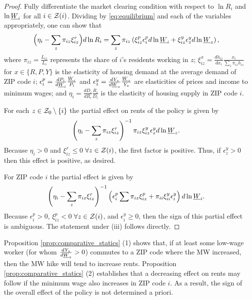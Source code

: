 \begin{proof}
    Fully differentiate the market clearing condition with respect to $\ln R_i$ 
    and $\ln \underline{W}_i$ for all $i\in\mathcal{Z}(i)$.
    Dividing by \ref{eq:equilibrium} and each of the variables appropriately, 
    one can show that
    \begin{equation}\label{eq:diff_equilibrium}
        \Big(\eta_i - \sum_z \pi_{iz} \xi^r_{iz} \Big) d \ln R_i
        = 
        \sum_z \pi_{iz} \left(\xi^p_{iz} \epsilon_{i}^p d \ln \underline{W}_i 
                            + \xi^y_{iz} \epsilon_{z}^y d \ln \underline{W}_z \right) ,
    \end{equation}
    where
    $\pi_{iz} = \frac{L_{iz}}{L_i}$ represents the share of $i$'s residents 
    working in $z$;
    $\xi_{iz}^x = \frac{d h_{iz}}{d x_i} \frac{x_i}{\sum_z \pi_{iz} h_{iz}}$ for
    $x\in\{R,P,Y\}$ is the elasticity of housing demand at the average demand of
    ZIP code $i$;
    $\epsilon_{i}^p = \frac{d P_i}{d \underline{W}_i} \frac{\underline{W}_i}{P_i}$ and 
    $\epsilon_{z}^y = \frac{d Y_z}{d \underline{W}_z} \frac{\underline{W}_z}{Y_z}$ are
    elasticities of prices and income to minimum wages; and
    $\eta_i = \frac{d D_i}{d R_i} \frac{R_i}{D_i}$ is the elasticity 
    of housing supply in ZIP code $i$.

    For each $z\in\mathcal{Z}_0\setminus\{i\}$ the partial effect on rents of the policy
    is given by 
    $$\left(\eta_i - \sum_z \pi_{iz} \xi^r_{iz}\right)^{-1} 
      \pi_{iz}\xi^y_{iz}\epsilon_{z}^y d\ln\underline{W}_z.$$
    Because $\eta_i>0$ and $\xi^r_{iz}\leq 0$  $\forall z\in\mathcal{Z}(i)$, the first 
    factor is positive.
    Thus, if $\epsilon_{z}^y>0$ then this effect is positive, as desired.

    For ZIP code $i$ the partial effect is given by
    $$\left(\eta_i - \sum_z \pi_{iz} \xi^r_{iz}\right)^{-1} 
      \left(\epsilon_{i}^p \sum \pi_{iz}\xi^p_{iz} 
            + \pi_{ii}\xi^y_{ii}\epsilon_i^y \right)d\ln\underline{W}_i.$$
    Because $\epsilon_{i}^p>0$, $\xi^p_{iz}<0$ $\forall z\in\mathcal{Z}(i)$,
    and $\epsilon_{i}^y\geq0$, 
    then the sign of this partial effect is ambiguous.
    The statement under (iii) follows directly.
\end{proof}

Proposition \ref{prop:comparative_statics} (1) shows that, 
if at least some low-wage worker (for whom $\frac{d Y_z}{d \underline{W}_z}>0$) 
commutes to a ZIP code where the MW increased, 
then the MW hike will tend to increase rents.
Proposition \ref{prop:comparative_statics} (2) establishes that a decreasing
effect on rents may follow if the minimum wage also increases in ZIP code $i$.
As a result, the sign of the overall effect of the policy is not determined a 
priori.

